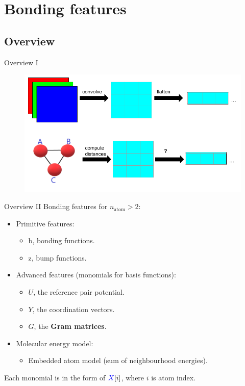 \documentclass{beamer}
\begin{document}
\section{Bonding features}
\subsection{Overview}
\begin{frame}{Overview I}
    \begin{figure}[H]
        \centering
            \includegraphics[scale=0.4]{img/slide/bonding_features.png}
        \label{fig:bonding_features}
    \end{figure}
\end{frame}

\begin{frame}{Overview II}
    Bonding features for $n_\text{atom} > 2$:
    \begin{itemize}
        \item Primitive features:
        \begin{itemize}
            \item {\color{olive}b}, bonding functions.
            \item {\color{olive}z}, bump functions.
        \end{itemize}
        \item Advanced features (monomials for basis functions):
        \begin{itemize}
            \item {\color{blue}$U$}, the reference pair potential.
            \item {\color{blue}$Y$}, the coordination vectors.
            \item {\color{blue}$G$}, the \textbf{Gram matrices}.
        \end{itemize}
        \item Molecular energy model:
        \begin{itemize}
            \item Embedded atom model (sum of neighbourhood energies).
        \end{itemize}
    \end{itemize}
    Each monomial is in the form of ${\color{blue}X}[i]$, where $i$ is atom index.
\end{frame}
\end{document}
